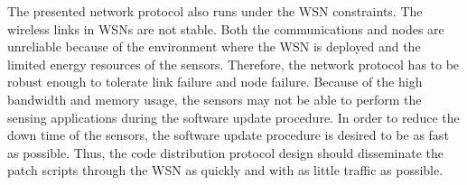 The presented network protocol also runs under the WSN constraints.
The wireless links in WSNs are not stable. Both the communications and nodes are unreliable because of the environment 
where the WSN is deployed and the limited energy resources of the sensors. Therefore, the network protocol has to be 
robust enough to tolerate link failure and node failure.
Because of the high bandwidth and memory usage, the sensors may not be able to perform the sensing applications during 
the software update procedure. In order to reduce the down time of the sensors, the software update procedure is 
desired to be as fast as possible. 
Thus, the code distribution protocol design should disseminate the patch scripts through the WSN as quickly and with as 
little traffic as possible.

%
%
%
%
%
%
